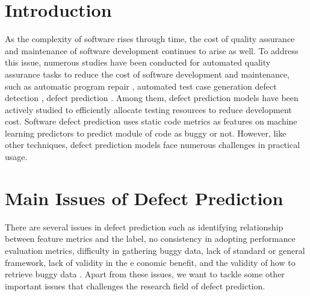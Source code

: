 \section{Introduction}
As the complexity of software rises through time, the cost of quality assurance and maintenance of software development continues to arise as well.
To address this issue, numerous studies have been conducted for automated quality assurance tasks to reduce the cost of software development and maintenance, such as automatic program repair \cite{kim2013automatic, long2016automatic, mechtaev2016angelix}, automated test case generation \cite{ali2009systematic, anand2013orchestrated, lei2008ipog} defect detection \cite{pradel2012leveraging, pradel2018deepbugs, wang2016bugram}, defect prediction \cite{nam2017heterogeneous, wang2016automatically, zimmermann2009cross}.
Among them, defect prediction models have been actively studied to efficiently allocate testing resources to reduce development cost.
Software defect prediction uses static code metrics as features on machine learning predictors to predict module of code as buggy or not. 
However, like other techniques, defect prediction models face numerous challenges in practical usage.

\section{Main Issues of Defect Prediction}
There are several issues in defect prediction such as identifying relationship between feature metrics and the label, no consistency in adopting performance evaluation metrics, difficulty in gathering buggy data, lack of standard or general framework, lack of validity in the e
conomic benefit, and the validity of how to retrieve buggy data \cite{arora2015open, herbold2019issues}.
Apart from these issues, we want to tackle some other important issues that challenges the research field of defect prediction.


